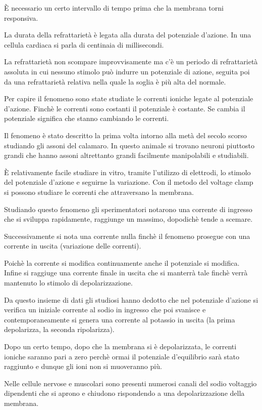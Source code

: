 \documentclass[]{article}
\begin{document}
È necessario un certo intervallo di tempo prima che la membrana torni
responsiva.

La durata della refrattarietà è legata alla durata del potenziale
d'azione. In una cellula cardiaca si parla di centinaia di millisecondi.

La refrattarietà non scompare improvvisamente ma c'è un periodo di
refrattarietà assoluta in cui nessuno stimolo può indurre un potenziale
di azione, seguita poi da una refrattarietà relativa nella quale la
soglia è più alta del normale.

Per capire il fenomeno sono state studiate le correnti ioniche legate al
potenziale d'azione. Finchè le correnti sono costanti il potenziale è
costante. Se cambia il potenziale significa che stanno cambiando le
correnti.

Il fenomeno è stato descritto la prima volta intorno alla metà del
secolo scorso studiando gli assoni del calamaro. In questo animale si
trovano neuroni piuttosto grandi che hanno assoni altrettanto grandi
facilmente manipolabili e studiabili.

È relativamente facile studiare in vitro, tramite l'utilizzo di
elettrodi, lo stimolo del potenziale d'azione e seguirne la variazione.
Con il metodo del voltage clamp si possono studiare le correnti che
attraversano la membrana.

Studiando questo fenomeno gli sperimentatori notarono una corrente di
ingresso che si sviluppa rapidamente, raggiunge un massimo, dopodichè
tende a scemare.

Successivamente si nota una corrente nulla finchè il fenomeno prosegue
con una corrente in uscita (variazione delle correnti).

Poichè la corrente si modifica continuamente anche il potenziale si
modifica. Infine si raggiuge una corrente finale in uscita che si
manterrà tale finchè verrà mantenuto lo stimolo di depolarizzazione.

Da questo insieme di dati gli studiosi hanno dedotto che nel potenziale
d'azione si verifica un iniziale corrente al sodio in ingresso che poi
svanisce e contemporaneamente si genera una corrente al potassio in
uscita (la prima depolarizza, la seconda ripolarizza).

Dopo un certo tempo, dopo che la membrana si è depolarizzata, le
correnti ioniche saranno pari a zero perchè ormai il potenziale
d'equilibrio sarà stato raggiunto e dunque gli ioni non si muoveranno
più.

Nelle cellule nervose e muscolari sono presenti numerosi canali del
sodio voltaggio dipendenti che si aprono e chiudono rispondendo a una
depolarizzazione della membrana.
\end{document}
